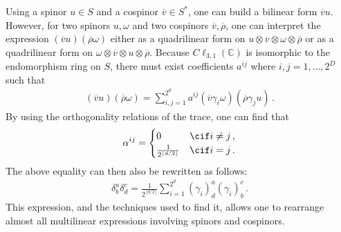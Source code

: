     Using a spinor $u\in S$ and a cospinor $\overline{v}\in S^*$, one can build a bilinear form $\overline{v}u$. However, for two spinors $u,\omega$ and two cospinors $\overline{v},\overline{\rho}$, one can interpret the expression $(\overline{v}u)(\overline{\rho}\omega)$ either as a quadrilinear form on $u\otimes\overline{v}\otimes\omega\otimes\overline{\rho}$ or as a quadrilinear form on $\omega\otimes\overline{v}\otimes u\otimes\overline{\rho}$. Because $C\ell_{3,1}(\mathbb{C})$ is isomorphic to the endomorphism ring on $S$, there must exist coefficients $a^{ij}$ where $i,j=1,\ldots,2^D$ such that
    \begin{gather}
        (\overline{v}u)(\overline{\rho}\omega) = \sum_{i,j=1}^{2^d}a^{ij}(\overline{v}\gamma_i\omega)(\overline{\rho}\gamma_ju)\,.
    \end{gather}
    By using the orthogonality relations of the trace, one can find that
    \begin{gather}
        \alpha^{ij} =
        \begin{cases}
            0&\cif i\neq j\,,\\
            \frac{1}{2^{\lfloor d/2 \rfloor}}&\cif i=j\,.
        \end{cases}
    \end{gather}
    The above equality can then also be rewritten as follows:
    \begin{gather}
        \delta_b^a\delta_d^c = \frac{1}{2^{\lfloor d/2 \rfloor}}\sum_{i=1}^{2^d}(\gamma_i)_d^a(\gamma_i)_b^c\,.
    \end{gather}
    This expression, and the techniques used to find it, allows one to rearrange almost all multilinear expressions involving spinors and cospinors.